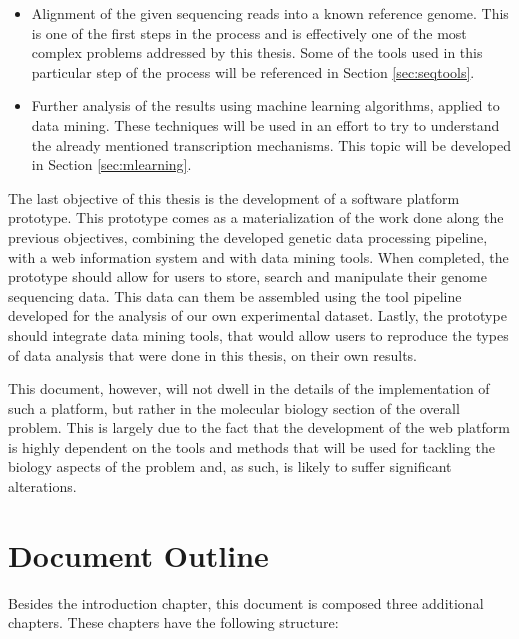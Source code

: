 \begin{itemize}

  \item
  Alignment of the given sequencing reads into a known reference genome. This is
  one of the first steps in the \rnaseq{} process and is effectively one of the
  most complex problems addressed by this thesis. Some of the tools used in this
  particular step of the process will be referenced in Section \ref{sec:seqtools}.

  \item
  Further analysis of the \rnaseq{} results using machine learning algorithms,
  applied to data mining. These techniques will be used in an effort to try to
  understand the already mentioned transcription mechanisms. This topic will be
  developed in Section \ref{sec:mlearning}.

\end{itemize}

The last objective of this thesis is the development of a software platform
prototype. This prototype comes as a materialization of the work done along the
previous objectives, combining the developed genetic data processing pipeline,
with a web information system and with data mining tools. When completed, the
prototype should allow for users to store, search and manipulate their genome
sequencing data. This data can them be assembled using the tool pipeline
developed for the analysis of our own experimental dataset. Lastly, the
prototype should integrate data mining tools, that would allow users to
reproduce the types of data analysis that were done in this thesis, on their own
results.

This document, however, will not dwell in the details of the implementation of
such a platform, but rather in the molecular biology section of the overall
problem. This is largely due to the fact that the development of the web
platform is highly dependent on the tools and methods that will be used for
tackling the biology aspects of the problem and, as such, is likely to suffer
significant alterations.

\section{Document Outline} \label{sec:outline}

Besides the introduction chapter, this document is composed three additional
chapters. These chapters have the following structure:

